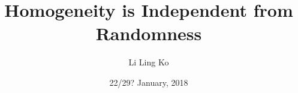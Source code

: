 \documentclass[notes]{beamer}
\title{Homogeneity is Independent from Randomness}
\author{Li Ling Ko}
\institute{University of Notre Dame}
\date{22/29? January, 2018}
\begin{document}
\begin{frame}
  \titlepage
\end{frame}




\end{document}

